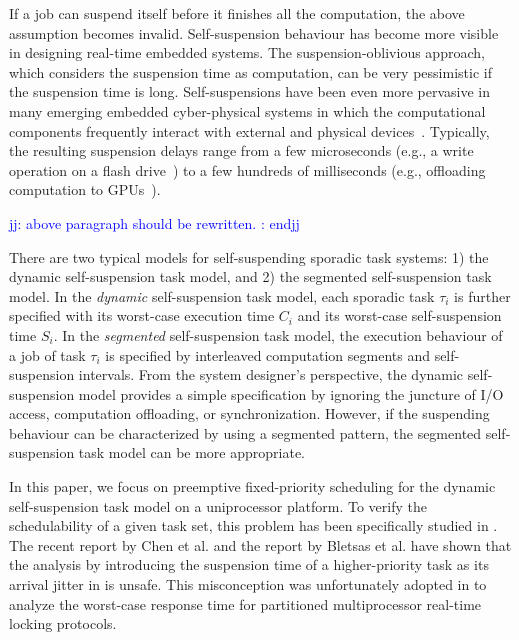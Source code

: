 \documentclass[10pt,conference,preprint]{IEEEtran}
\newcommand{\jj}[1]{\textcolor{blue}{jj: #1 : endjj}}
\begin{document}
If a job can suspend itself before it finishes all the computation,
the above assumption becomes invalid.  Self-suspension behaviour has
become more visible in designing real-time embedded systems.  The
suspension-oblivious approach, which considers the suspension time as
computation, can be very pessimistic if the suspension time is
long. Self-suspensions have been even more pervasive in many emerging
embedded cyber-physical systems in which the computational components
frequently interact with external and physical
devices~\cite{Kang:rtss07,Kato_2011}.  Typically, the resulting
suspension delays range from a few microseconds (e.g., a write
operation on a flash drive~\cite{Kang:rtss07}) to a few hundreds of
milliseconds (e.g., offloading computation to
GPUs~\cite{Kato_2011,Liu_2014}).

\jj{above paragraph should be rewritten.}

There are two typical models for self-suspending sporadic task
systems: 1) the dynamic self-suspension task model, and 2) the
segmented self-suspension task model. In the \emph{dynamic}
self-suspension task model, each sporadic task $\tau_i$ is further
specified with its worst-case execution time $C_i$ and its worst-case
self-suspension time $S_i$. In the \emph{segmented} self-suspension
task model, the execution behaviour of a job of task $\tau_i$ is
specified by interleaved computation segments and self-suspension
intervals.  From the system designer's perspective, the dynamic
self-suspension model provides a simple specification by ignoring the
juncture of I/O access, computation offloading, or
synchronization. However, if the suspending behaviour can be
characterized by using a segmented pattern, the segmented
self-suspension task model can be more appropriate.

In this paper, we focus on preemptive fixed-priority scheduling for
the dynamic self-suspension task model on a uniprocessor platform. To
verify the schedulability of a given task set, this problem has been
specifically studied in
\cite{RTCSA-KimCPKH95,MingLiRTCSA1994,ECRTS-AudsleyB04,RTAS-AudsleyB04,huangpass:dac2015}.
The recent report by Chen et al. and the report by Bletsas et
al. \cite{BletsasReport2015} have shown that the analysis by
introducing the suspension time of a higher-priority task as its
arrival jitter in
\cite{ECRTS-AudsleyB04,RTAS-AudsleyB04,RTCSA-KimCPKH95,MingLiRTCSA1994}
is unsafe.  This misconception was unfortunately adopted in
\cite{zeng-2011,bbb-2013,yang-2013,kim-2014,han-2014,carminati-2014,yang-2014,lakshmanan-2009}
to analyze the worst-case response time for partitioned multiprocessor
real-time locking protocols.
\end{document}
